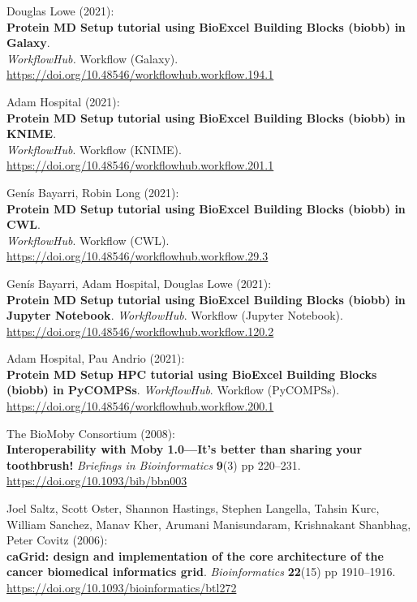 \begin{thebibliography}{9}
Douglas Lowe (2021):\\
\textbf{Protein MD Setup tutorial using BioExcel Building Blocks (biobb)
in Galaxy}.\\
\emph{WorkflowHub.} Workflow (Galaxy).\\
\url{https://doi.org/10.48546/workflowhub.workflow.194.1}

Adam Hospital (2021):\\
\textbf{Protein MD Setup tutorial using BioExcel Building Blocks (biobb)
in KNIME}.\\
\emph{WorkflowHub}. Workflow (KNIME).\\
\url{https://doi.org/10.48546/workflowhub.workflow.201.1}

Genís Bayarri, Robin Long (2021):\\
\textbf{Protein MD Setup tutorial using BioExcel Building Blocks (biobb)
in CWL}.\\
\emph{WorkflowHub}. Workflow (CWL).\\
\url{https://doi.org/10.48546/workflowhub.workflow.29.3}

Genís Bayarri, Adam Hospital, Douglas Lowe (2021):\\
\textbf{Protein MD Setup tutorial using BioExcel Building Blocks (biobb)
in Jupyter Notebook}. \emph{WorkflowHub}. Workflow (Jupyter Notebook).\\
\url{https://doi.org/10.48546/workflowhub.workflow.120.2}

Adam Hospital, Pau Andrio (2021):\\
\textbf{Protein MD Setup HPC tutorial using BioExcel Building Blocks
(biobb) in PyCOMPSs}. \emph{WorkflowHub}. Workflow (PyCOMPSs).\\
\url{https://doi.org/10.48546/workflowhub.workflow.200.1}

The BioMoby Consortium (2008):\\
\textbf{Interoperability with Moby 1.0---It's better than sharing your
toothbrush!} \emph{Briefings in Bioinformatics} \textbf{9}(3) pp
220--231.\\
\url{https://doi.org/10.1093/bib/bbn003}

Joel Saltz, Scott Oster, Shannon Hastings, Stephen Langella,
Tahsin Kurc, William Sanchez, Manav Kher, Arumani Manisundaram,
Krishnakant Shanbhag, Peter Covitz (2006):\\
\textbf{caGrid: design and implementation of the core architecture of
the cancer biomedical informatics grid}. \emph{Bioinformatics}
\textbf{22}(15) pp 1910--1916.\\
\url{https://doi.org/10.1093/bioinformatics/btl272}


\end{thebibliography}
